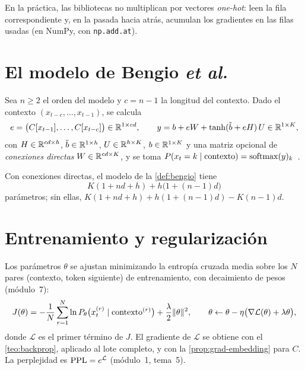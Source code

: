 En la práctica, las bibliotecas no multiplican por vectores \emph{one-hot}: leen la fila correspondiente y, en la pasada hacia atrás, acumulan los gradientes en las filas usadas (en NumPy, con \texttt{np.add.at}).

\section{El modelo de Bengio \emph{et al.}}

\begin{definicion}\label{def:bengio}
Sea $n\ge 2$ el orden del modelo y $c=n-1$ la longitud del contexto. Dado el contexto $(x_{t-c},\dots,x_{t-1})$, se calcula
\[
e=\bigl(C[x_{t-1}],\dots,C[x_{t-c}]\bigr)\in\mathbb{R}^{1\times cd},\qquad
y=b+eW+\tanh(\tilde b+eH)\,U\in\mathbb{R}^{1\times K},
\]
con $H\in\mathbb{R}^{cd\times h}$, $\tilde b\in\mathbb{R}^{1\times h}$, $U\in\mathbb{R}^{h\times K}$, $b\in\mathbb{R}^{1\times K}$ y una matriz opcional de \emph{conexiones directas} $W\in\mathbb{R}^{cd\times K}$, y se toma $P(x_t=k\mid\text{contexto})=\operatorname{softmax}(y)_k$~\cite[§2]{bengio}.
\end{definicion}

\begin{proposicion}\label{prop:param-bengio}
Con conexiones directas, el modelo de la \cref{def:bengio} tiene
\[
K(1+nd+h)+h\bigl(1+(n-1)d\bigr)
\]
parámetros; sin ellas, $K(1+nd+h)+h(1+(n-1)d)-K(n-1)d$.
\end{proposicion}

\addtocounter{figure}{1}%

\addtocounter{definicion}{1}%

\section{Entrenamiento y regularización}

Los parámetros $\theta$ se ajustan minimizando la entropía cruzada media sobre los $N$ pares (contexto, token siguiente) de entrenamiento, con decaimiento de pesos (módulo~7):
\[
J(\theta)=-\frac1N\sum_{r=1}^{N}\ln P_\theta\bigl(x^{(r)}_t\mid\text{contexto}^{(r)}\bigr)+\frac{\lambda}{2}\lVert\theta\rVert^{2},
\qquad \theta\leftarrow\theta-\eta\bigl(\nabla\mathcal{L}(\theta)+\lambda\theta\bigr),
\]
donde $\mathcal{L}$ es el primer término de $J$. El gradiente de $\mathcal{L}$ se obtiene con el \cref{teo:backprop}, aplicado al lote completo, y con la \cref{prop:grad-embedding} para $C$. La perplejidad es $\operatorname{PPL}=e^{\mathcal{L}}$ (módulo~1, tema~5).

